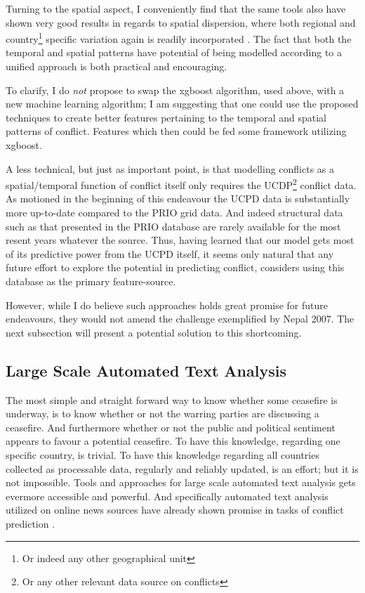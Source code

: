 \documentclass[a4paper]{article}
\begin{document}
Turning to the spatial aspect, I conveniently find that the same tools also have shown very good results in regards to spatial dispersion, where both regional and country\footnote{Or indeed any other geographical unit} specific variation again is readily incorporated \citep{gelfand2003spatial, gelfand2012hierarchical, gelfand2016spatial}. The fact that both the temporal and spatial patterns have potential of being modelled according to a unified approach is both practical and encouraging.\par

To clarify, I do \emph{not} propose to swap the xgboost algorithm, used above, with a new machine learning algorithm; I am suggesting that one could use the proposed techniques to create better features pertaining to the temporal and spatial patterns of conflict. Features which then could be fed some framework utilizing xgboost.\par

A less technical, but just as important point, is that modelling conflicts as a spatial/temporal function of conflict itself only requires the UCDP\footnote{Or any other relevant data source on conflicts} conflict data. As motioned in the beginning of this endeavour the UCPD data is substantially more up-to-date compared to the PRIO grid data. And indeed structural data such as that presented in the PRIO database are rarely available for the most resent years whatever the source. Thus, having learned that our model gets most of its predictive power from the UCPD itself, it seems only natural that any future effort to explore the potential in predicting conflict, considers using this database as the primary feature-source.\par

However, while I do believe such approaches holds great promise for future endeavours, they would not amend the challenge exemplified by Nepal 2007. The next subsection will present a potential solution to this shortcoming.\par

\subsection{Large Scale Automated Text Analysis}

The most simple and straight forward way to know whether some ceasefire is underway, is to know whether or not the warring parties are discussing a ceasefire. And furthermore whether or not the public and political sentiment appears to favour a potential ceasefire. To have this knowledge, regarding one specific country, is trivial. To have this knowledge regarding all countries collected as processable data, regularly and reliably updated, is an effort; but it is not impossible. Tools and approaches for large scale automated text analysis gets evermore accessible and powerful. And specifically automated text analysis utilized on online news sources have already shown promise in tasks of conflict prediction \citep{chadefaux_2014, mueller_2016}. 
\end{document}
